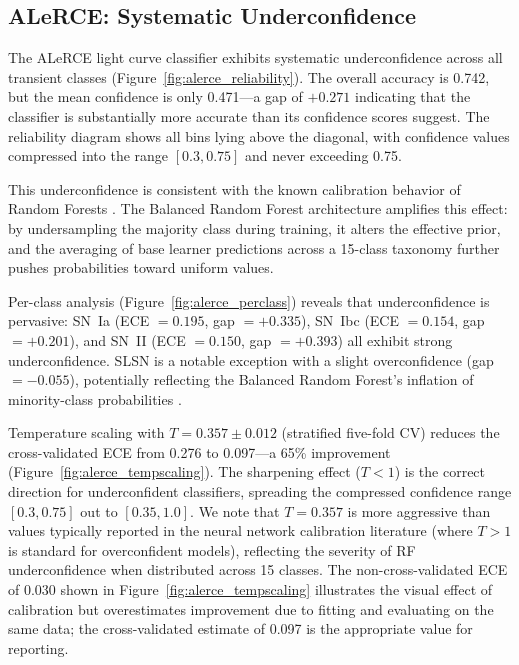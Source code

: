 \documentclass[twocolumn]{aastex631}
\begin{document}
\subsection{ALeRCE: Systematic Underconfidence} \label{sec:alerce}

The ALeRCE light curve classifier exhibits systematic underconfidence across all transient classes (Figure~\ref{fig:alerce_reliability}). The overall accuracy is 0.742, but the mean confidence is only 0.471---a gap of $+0.271$ indicating that the classifier is substantially more accurate than its confidence scores suggest. The reliability diagram shows all bins lying above the diagonal, with confidence values compressed into the range $[0.3, 0.75]$ and never exceeding 0.75.

This underconfidence is consistent with the known calibration behavior of Random Forests \citep{niculescumizil2005, bostrom2008}. The Balanced Random Forest architecture amplifies this effect: by undersampling the majority class during training, it alters the effective prior, and the averaging of base learner predictions across a 15-class taxonomy further pushes probabilities toward uniform values.

Per-class analysis (Figure~\ref{fig:alerce_perclass}) reveals that underconfidence is pervasive: SN~Ia (ECE $= 0.195$, gap $= +0.335$), SN~Ibc (ECE $= 0.154$, gap $= +0.201$), and SN~II (ECE $= 0.150$, gap $= +0.393$) all exhibit strong underconfidence. SLSN is a notable exception with a slight overconfidence (gap $= -0.055$), potentially reflecting the Balanced Random Forest's inflation of minority-class probabilities \citep{vandengoorbergh2022}.

Temperature scaling with $T = 0.357 \pm 0.012$ (stratified five-fold CV) reduces the cross-validated ECE from 0.276 to 0.097---a 65\% improvement (Figure~\ref{fig:alerce_tempscaling}). The sharpening effect ($T < 1$) is the correct direction for underconfident classifiers, spreading the compressed confidence range $[0.3, 0.75]$ out to $[0.35, 1.0]$. We note that $T = 0.357$ is more aggressive than values typically reported in the neural network calibration literature (where $T > 1$ is standard for overconfident models), reflecting the severity of RF underconfidence when distributed across 15 classes. The non-cross-validated ECE of 0.030 shown in Figure~\ref{fig:alerce_tempscaling} illustrates the visual effect of calibration but overestimates improvement due to fitting and evaluating on the same data; the cross-validated estimate of 0.097 is the appropriate value for reporting.
\end{document}

